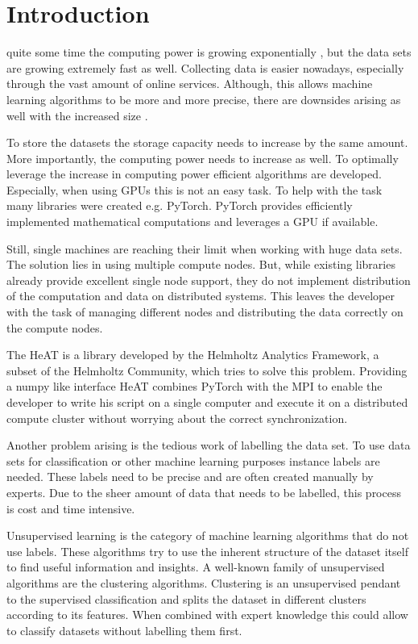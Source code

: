 
\section{Introduction}
\label{sec:intro}
  quite some time the computing power is growing exponentially \cite{moore_cramming_1998}, but the data sets are growing extremely fast as well.
Collecting data is easier nowadays, especially through the vast amount of online services.
Although, this allows machine learning algorithms to be more and more precise, there are downsides arising as well with
the increased size \cite{khan_big_2014}.

To store the datasets the storage capacity needs to increase by the same amount. More importantly, the computing power needs to increase
as well. To optimally leverage the increase in computing power efficient algorithms are developed.
Especially, when using \glspl{GPU} this is not an easy task. To help with the task many libraries were created e.g. PyTorch.
\gls{PyTorch} provides efficiently implemented mathematical computations and leverages a \gls{GPU} if available.

Still, single machines are reaching their limit when working with huge data sets. The solution lies in using multiple compute nodes.
But, while existing libraries already provide excellent single node support, they do not implement distribution of the computation and data on distributed systems.
This leaves the developer with the task of managing different nodes and distributing the data correctly on the compute nodes.

The \gls{HeAT} is a library developed by the Helmholtz Analytics Framework, a subset of the Helmholtz Community, which tries to solve this problem.
Providing a \gls{numpy} like interface \gls{HeAT} combines \gls{PyTorch} with the \gls{MPI} to enable the developer to write his script on a single computer
and execute it on a distributed compute cluster without worrying about the correct synchronization.

Another problem arising is the tedious work of labelling the data set.
To use data sets for classification or other machine learning purposes instance labels are needed.
These labels need to be precise and are often created manually by experts.
Due to the sheer amount of data that needs to be labelled, this process is cost and time intensive.

Unsupervised learning is the category of machine learning algorithms that do not use labels. These algorithms try to
use the inherent structure of the dataset itself to find useful information and insights.
A well-known family of unsupervised algorithms are the clustering algorithms. Clustering is an unsupervised pendant to the supervised classification
and splits the dataset in different clusters according to its features.
When combined with expert knowledge this could allow to classify datasets without labelling them first.

